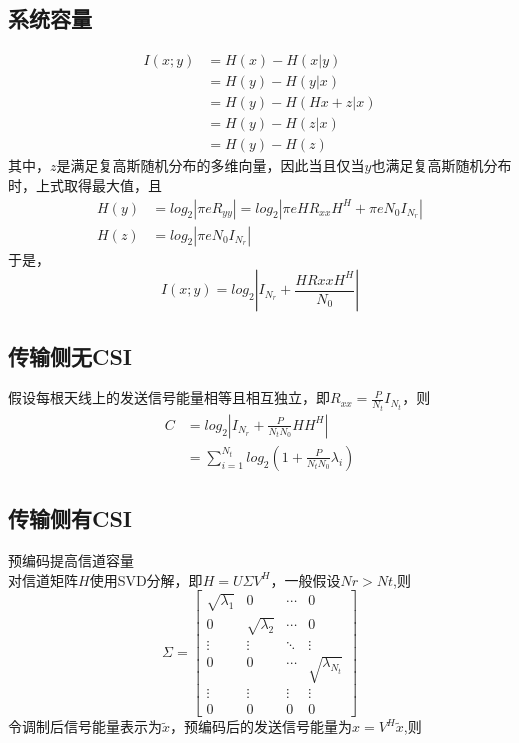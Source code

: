 \documentclass[12pt,a4paper]{ctexart}  %
\begin{document}
\subsection{系统容量}
\begin{equation}
    \begin{aligned}
        I(x;y)&=H(x)-H(x|y)\\
        &=H(y)-H(y|x) \\
        &=H(y)-H(Hx+z|x) \\
        &=H(y)-H(z|x) \\
        &=H(y)-H(z)
    \end{aligned}
\end{equation}
其中，$z$是满足复高斯随机分布的多维向量，因此当且仅当$y$也满足复高斯随机分布时，上式取得最大值，且
\begin{equation}
\begin{aligned}
    H(y)&=log_2|\pi eR_{yy}| =log_2|\pi eHR_{xx}H^H+\pi eN_0I_{N_r}| \\
    H(z)&=log_2|\pi e N_0I_{N_r}|
\end{aligned}
\end{equation}
于是，
\begin{equation}
    I(x;y)=log_2\left|I_{N_r} + \frac{HR{xx}H^H}{N_0}\right|
\end{equation}

\subsection{传输侧无CSI}
假设每根天线上的发送信号能量相等且相互独立，即$R_{xx}=\frac{P}{N_t}I_{N_t}$，则
\begin{equation}
    \begin{aligned}
    C&=log_2\left|I_{N_r} + \frac{P}{N_tN_0}HH^H\right| \\
    &=\sum_{i=1}^{N_t}log_2(1+\frac{P}{N_tN_0}\lambda_i)
    \end{aligned}
\end{equation}

\subsection{传输侧有CSI}
预编码提高信道容量 \\
对信道矩阵$H$使用SVD分解，即$H=U\Sigma V^H$，一般假设$Nr>Nt$,则
\begin{equation}
\Sigma=\left[ 
    \begin{matrix}
        \sqrt{\lambda_1} & 0 & \cdots & 0 \\
        0 & \sqrt{\lambda_2} & \cdots & 0 \\
        \vdots & \vdots & \ddots & \vdots \\
        0 & 0 & \cdots & \sqrt{\lambda_{N_t}} \\
        \vdots & \vdots & \vdots & \vdots \\
        0 & 0 & 0 & 0
    \end{matrix}
\right] 
\end{equation}
令调制后信号能量表示为$\tilde{x}$，预编码后的发送信号能量为$x=V^H\tilde{x}$,则
\end{document}
